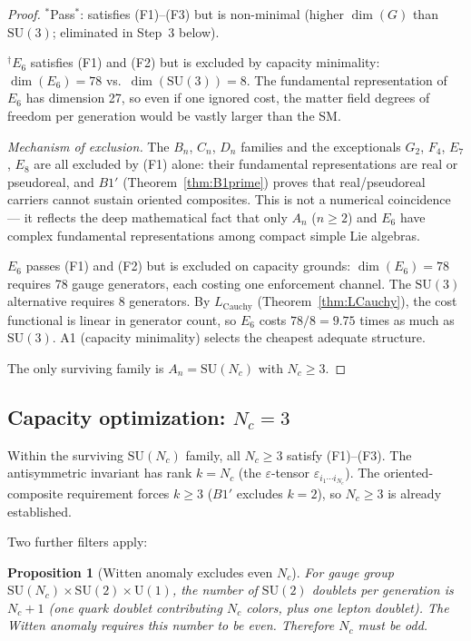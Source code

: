 \documentclass[11pt,a4paper]{article}
\newtheorem{proposition}[theorem]{Proposition}
\theoremstyle{definition}
\newcommand{\SU}{\mathrm{SU}}
\newcommand{\U}{\mathrm{U}}
\begin{document}
\begin{proof}
\smallskip\noindent ${}^*$Pass$^*$: satisfies (F1)--(F3) but is
non-minimal (higher $\dim(G)$ than $\SU(3)$; eliminated in Step~3
below).

\smallskip\noindent ${}^\dagger$$E_6$ satisfies (F1) and (F2) but is
excluded by capacity minimality: $\dim(E_6) = 78$ vs.\
$\dim(\SU(3)) = 8$.  The fundamental representation of $E_6$ has
dimension 27, so even if one ignored cost, the matter field
degrees of freedom per generation would be vastly larger than the SM.

\medskip\noindent\textit{Mechanism of exclusion.}\quad
The $B_n$, $C_n$, $D_n$ families and the exceptionals $G_2$, $F_4$,
$E_7$, $E_8$ are all excluded by (F1) alone: their fundamental
representations are real or pseudoreal, and $B1'$
(Theorem~\ref{thm:B1prime}) proves that real/pseudoreal carriers
cannot sustain oriented composites.  This is not a numerical
coincidence --- it reflects the deep mathematical fact that only $A_n$
($n \ge 2$) and $E_6$ have complex fundamental representations among
compact simple Lie algebras.

$E_6$ passes (F1) and (F2) but is excluded on capacity grounds:
$\dim(E_6) = 78$ requires 78 gauge generators, each costing one
enforcement channel.  The $\SU(3)$ alternative requires 8 generators.
By $L_{\mathrm{Cauchy}}$ (Theorem~\ref{thm:LCauchy}), the cost
functional is linear in generator count, so $E_6$ costs
$78/8 = 9.75$ times as much as $\SU(3)$.  A1 (capacity minimality)
selects the cheapest adequate structure.

The only surviving family is $A_n = \SU(N_c)$ with $N_c \ge 3$.
\end{proof}


\subsection{Capacity optimization: $N_c = 3$}
\label{sec:Nc_optimization}

Within the surviving $\SU(N_c)$ family, all $N_c \ge 3$ satisfy
(F1)--(F3).  The antisymmetric invariant has rank $k = N_c$
(the $\varepsilon$-tensor $\varepsilon_{i_1 \cdots i_{N_c}}$).
The oriented-composite requirement forces $k \ge 3$
($B1'$ excludes $k = 2$), so $N_c \ge 3$ is already established.

Two further filters apply:

\begin{proposition}[Witten anomaly excludes even $N_c$]\label{prop:witten}
For gauge group $\SU(N_c) \times \SU(2) \times \U(1)$, the number of
$\SU(2)$ doublets per generation is $N_c + 1$ (one quark doublet
contributing $N_c$ colors, plus one lepton doublet).  The Witten anomaly
\cite{Witten1982} requires this number to be even.  Therefore $N_c$ must
be odd.
\end{proposition}
\end{document}
